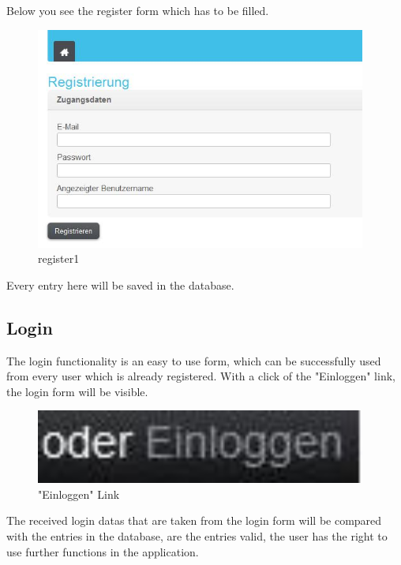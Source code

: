 Below you see the register form which has to be filled.
\begin{figure}[!ht]
  \centering
    \includegraphics[width=0.97\textwidth]{images/basic_functionalities/register_form.jpg}
  \caption{register1}
  \label{fig:register1}
\end{figure}

Every entry here will be saved in the database.

\subsection{Login}

The login functionality is an easy to use form, which can be successfully used from every user which is already registered. With a click of the "Einloggen" link, the login form will be visible.
\begin{figure}[!ht]
  \centering
    \includegraphics[width=0.97\textwidth]{images/basic_functionalities/oderEinloggen.jpg}
  \caption{"Einloggen" Link}
  \label{fig:einloggen}
\end{figure}

The received login datas that are taken from the login form will be compared with the entries in the database, are the entries valid, the user has the right to use further functions in the application.

